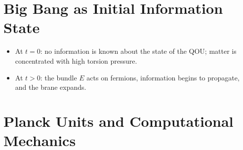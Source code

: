 
\section{Big Bang as Initial Information State}
\label{sec:big-bang-info}

\begin{itemize}
  \item At $t = 0$: no information is known about the state of the QOU;
        matter is concentrated with high torsion pressure.
  \item At $t > 0$: the bundle $E$ acts on fermions, information begins to
        propagate, and the brane expands.
\end{itemize}


\section{Planck Units and Computational Mechanics}
\label{sec:planck-computation}



